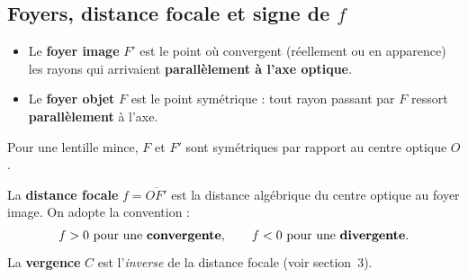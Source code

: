 \documentclass[11pt,a4paper]{article}
\newcommand{\LentilleConv}[2]{%
  \draw[verrecol,line width=1.8pt,<->,>=Stealth] (#1,-#2)--(#1,#2);}
\begin{document}
\subsection{Foyers, distance focale et signe de $f$}

\begin{definition}
\hfill
\begin{itemize}[leftmargin=1.7em,topsep=2pt,itemsep=2pt]
  \item Le \textbf{foyer image} $F'$ est le point où convergent (réellement ou en apparence) les rayons
        qui arrivaient \textbf{parallèlement à l'axe optique}.
  \item Le \textbf{foyer objet} $F$ est le point symétrique : tout rayon passant par $F$ ressort
        \textbf{parallèlement} à l'axe.
\end{itemize}
Pour une lentille mince, $F$ et $F'$ sont symétriques par rapport au centre optique $O$.
\end{definition}

\begin{definition}
La \textbf{distance focale} $f=\overline{OF'}$ est la distance algébrique du centre optique au foyer
image. On adopte la convention :
\[ f>0 \text{ pour une \textbf{convergente}}, \qquad f<0 \text{ pour une \textbf{divergente}}. \]
La \textbf{vergence} $C$ est l'\emph{inverse} de la distance focale (voir section~3).
\end{definition}

\begin{center}
\end{center}
\end{document}
